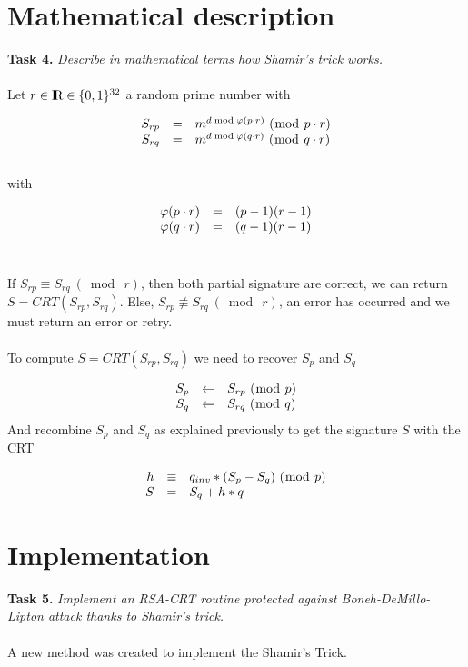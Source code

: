 \documentclass[a4paper]{report}
\def\R{\textrm{I\kern-0.21emR}}
\begin{document}
\section{Mathematical description}
\textbf{Task 4.} \textit{Describe in mathematical terms how Shamir’s trick works.}
\\ \\
Let $r \in \R \in \{0,1\}^{32}$ a random prime number with

\[
\left .
   \begin{array}{r c l}
      S_{rp}  & =  & m^{d\bmod\varphi (p\cdot r)}\ (\bmod\ p\cdot r) \\
      S_{rq}  & =  & m^{d\bmod\varphi (q\cdot r)}\ (\bmod\ q\cdot r)
   \end{array}
\right .
\]
\ 
\\
with

\[
\left .
   \begin{array}{r c l}
      \varphi (p\cdot r)  & =  & (p-1)(r-1) \\
      \varphi (q\cdot r)  & =  & (q-1)(r-1)
   \end{array}
\right .
\]
\ 

If $S_{rp} \equiv S_{rq}\ (\bmod\ r)$, then both partial signature are correct, we can return $S = CRT(S_{rp}, S_{rq})$. Else, $S_{rp} \not\equiv S_{rq}\ (\bmod\ r)$, an error has occurred and we must return an error or retry.
\\ \\
To compute $S = CRT(S_{rp}, S_{rq})$ we need to recover $S_{p}$ and $S_{q}$

\[
\left .
   \begin{array}{r c l}
      S_{p}  & \leftarrow  & S_{rp}\ (\bmod\ p) \\
      S_{q}  & \leftarrow  & S_{rq}\ (\bmod\ q)
   \end{array}
\right .
\]
And recombine $S_{p}$ and $S_{q}$ as explained previously to get the signature $S$ with the CRT

\[
\left .
   \begin{array}{r c l}
      h         & \equiv       & q_{inv} * (S_p - S_q)\ (\bmod\ p) \\
      S         & =              & S_q + h*q 
   \end{array}
\right .
\]

\newpage
\section{Implementation}
\textbf{Task 5.} \textit{Implement an RSA-CRT routine protected against Boneh-DeMillo-Lipton attack thanks to Shamir’s trick.}
\\ \\
A new method was created to implement the Shamir's Trick.
\end{document}
